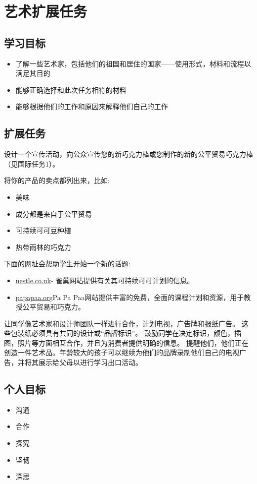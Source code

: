 \chapter{艺术扩展任务}

\section{学习目标}
  

\begin{itemize}
  \item 了解一些艺术家，包括他们的祖国和居住的国家——使用形式，材料和流程以满足其目的
  \item 能够正确选择和此次任务相符的材料
  \item 能够根据他们的工作和原因来解释他们自己的工作
\end{itemize}


\section{扩展任务}
    设计一个宣传活动，向公众宣传您的新巧克力棒或您制作的新的公平贸易巧克力棒（见国际任务1）。\par
    将你的产品的卖点都列出来，比如:\par
    \begin{itemize}
      \item 美味
      \item 成分都是来自于公平贸易
      \item 可持续可可豆种植
      \item 热带雨林的巧克力
    \end{itemize}  
    下面的网址会帮助学生开始一个新的话题:\par



    \begin{itemize}
      \item \href{http://www.nestle.co.uk/csv2013/socialimpact/responsiblesourcing/nestlecocoaplan}{nestle.co.uk}- 雀巢网站提供有关其可持续可可计划的信息。
      \item \href{http://www.papapaa.org}{papapaa.org}Pa Pa Paa网站提供丰富的免费，全面的课程计划和资源，用于教授公平贸易和巧克力。
    \end{itemize}
    
    让同学像艺术家和设计师团队一样进行合作，计划电视，广告牌和报纸广告。 这些包装纸必须具有共同的设计或“品牌标识”。 鼓励同学在决定标识，颜色，插图，照片等方面相互合作，并且为消费者提供明确的信息。 提醒他们，他们正在创造一件艺术品。年龄较大的孩子可以继续为他们的品牌录制他们自己的电视广告，并将其展示给父母以进行学习出口活动。\par
    


\section{个人目标}
\begin{itemize}
  \item 沟通
  \item 合作
  \item 探究
  \item 坚韧
  \item 深思 
\end{itemize}
